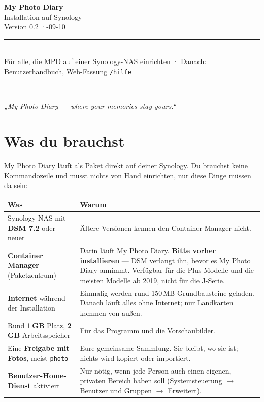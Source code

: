 \documentclass[11pt,a4paper]{article}
\let\mpdtt\texttt
\renewcommand{\texttt}[1]{\mpdtt{\textcolor{mpdred}{#1}}}
\newcommand{\kopf}[1]{\textbf{#1}}
\begin{document}

\begin{center}
  {\fontsize{36}{42}\selectfont\bfseries\color{mpdnavy} My Photo Diary}\\[6pt]
  {\fontsize{18}{22}\selectfont\color{mpdslate} Installation auf Synology}\\[8pt]
  {\fontsize{13}{16}\selectfont\color{mpdgrey} Version 0.2 \;·-09-10}\\[8pt]
  {\color{mpdrule}\rule{\linewidth}{1pt}}\\[6pt]
  {\color{mpdgrey}\small Für alle, die MPD auf einer Synology-NAS einrichten \;·\;
   Danach: Benutzerhandbuch, Web-Fassung \texttt{/hilfe}}\\[6pt]
  {\color{mpdrule}\rule{\linewidth}{1pt}}\\[8pt]
  {\itshape\color{mpdnavy} „My Photo Diary — where your memories stay yours.“}
\end{center}

\vspace{1em}
\tableofcontents
\newpage

\section{Was du brauchst}

My Photo Diary läuft als Paket direkt auf deiner Synology. Du brauchst keine
Kommandozeile und musst nichts von Hand einrichten, nur diese Dinge müssen da
sein:

\begin{tabularx}{\linewidth}{|l|L|}
\hline
{}\kopf{Was} & \kopf{Warum} \\ \hline
Synology NAS mit \textbf{DSM 7.2} oder neuer & Ältere Versionen kennen den
  Container Manager nicht. \\ \hline
\textbf{Container Manager} (Paketzentrum) & Darin läuft My Photo Diary.
  \textbf{Bitte vorher installieren} --- DSM verlangt ihn, bevor es My Photo
  Diary annimmt. Verfügbar für die Plus-Modelle und die meisten Modelle ab
  2019, nicht für die J-Serie. \\ \hline
\textbf{Internet} während der Installation & Einmalig werden rund 150\,MB
  Grundbausteine geladen. Danach läuft alles ohne Internet; nur Landkarten
  kommen von außen. \\ \hline
Rund \textbf{1\,GB} Platz, \textbf{2\,GB} Arbeitsspeicher & Für das Programm
  und die Vorschaubilder. \\ \hline
Eine \textbf{Freigabe mit Fotos}, meist \texttt{photo} & Eure gemeinsame
  Sammlung. Sie bleibt, wo sie ist; nichts wird kopiert oder importiert. \\ \hline
\textbf{Benutzer-Home-Dienst} aktiviert & Nur nötig, wenn jede Person auch
  einen eigenen, privaten Bereich haben soll (Systemsteuerung
  \(\rightarrow\) Benutzer und Gruppen \(\rightarrow\) Erweitert). \\ \hline
\end{tabularx}
\end{document}
